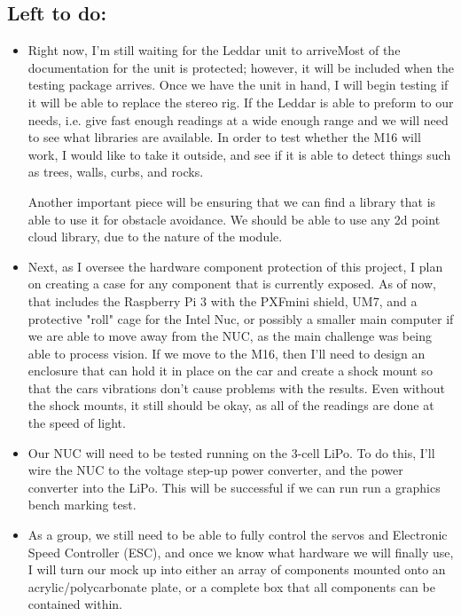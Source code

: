 \documentclass[compsoc,draftclsnofoot,onecolumn,10pt]{IEEEtran}
\begin{document}
	\subsection{Left to do:}
		\begin{itemize}
				\item Right now, I'm still waiting for the Leddar unit to arriveMost of the documentation for the unit is protected; however, it will be included when the testing package arrives. 
					Once we have the unit in hand, I will begin testing if it will be able to replace the stereo rig. 
					If the Leddar is able to preform to our needs, i.e. give fast enough readings at a wide enough range and we will need to see what libraries are available. 
					In order to test whether the M16 will work, I would like to take it outside, and see if it is able to detect things such as trees, walls, curbs, and rocks.
					
					Another important piece will be ensuring that we can find a library that is able to use it for obstacle avoidance. 
					We should be able to use any 2d point cloud library, due to the nature of the module.
			
				\item Next, as I oversee the hardware component protection of this project, I plan on creating a case for any component that is currently exposed. 
					As of now, that includes the Raspberry Pi 3 with the PXFmini shield, UM7, and a protective "roll" cage for the Intel Nuc, or possibly a smaller main computer if we are able to move away from the NUC, as the main challenge was being able to process vision. 
					If we move to the M16, then I'll need to design an enclosure that can hold it in place on the car and create a shock mount so that the cars vibrations don't cause problems with the results. 
					Even without the shock mounts, it still should be okay, as all of the readings are done at the speed of light. \\
					
				\item Our NUC will need to be tested running on the 3-cell LiPo. To do this, I'll wire the NUC to the voltage step-up power converter, and the power converter into the LiPo. 
					This will be successful if we can run run a graphics bench marking test. \\
		
				\item As a group, we still need to be able to fully control the servos and Electronic Speed Controller (ESC), and once we know what hardware we will finally use, I will turn our mock up into either an array of components mounted onto an acrylic/polycarbonate plate, or a complete box that all components can be contained within. 
		\end{itemize}
		
\end{document}
